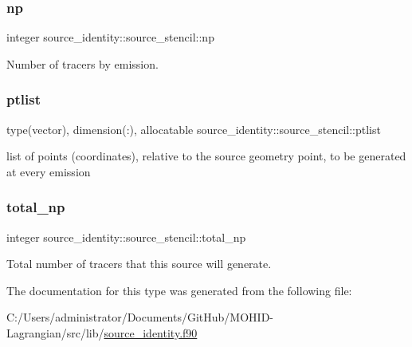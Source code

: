 \subsubsection{\texorpdfstring{np}{np}}
{\footnotesize\ttfamily integer source\+\_\+identity\+::source\+\_\+stencil\+::np\hspace{0.3cm}{\ttfamily [private]}}



Number of tracers by emission. 

\mbox{\label{structsource__identity_1_1source__stencil_a91822da10e869f72071fa29e2bb2c080}} 
\subsubsection{\texorpdfstring{ptlist}{ptlist}}
{\footnotesize\ttfamily type(vector), dimension(\+:), allocatable source\+\_\+identity\+::source\+\_\+stencil\+::ptlist\hspace{0.3cm}{\ttfamily [private]}}



list of points (coordinates), relative to the source geometry point, to be generated at every emission 

\mbox{\label{structsource__identity_1_1source__stencil_a11f7462457253157db252466b51000f2}} 
\subsubsection{\texorpdfstring{total\+\_\+np}{total\_np}}
{\footnotesize\ttfamily integer source\+\_\+identity\+::source\+\_\+stencil\+::total\+\_\+np\hspace{0.3cm}{\ttfamily [private]}}



Total number of tracers that this source will generate. 



The documentation for this type was generated from the following file\+:\begin{DoxyCompactItemize}
\item 
C\+:/\+Users/administrator/\+Documents/\+Git\+Hub/\+M\+O\+H\+I\+D-\/\+Lagrangian/src/lib/\mbox{\hyperlink{source__identity_8f90}{source\+\_\+identity.\+f90}}\end{DoxyCompactItemize}
